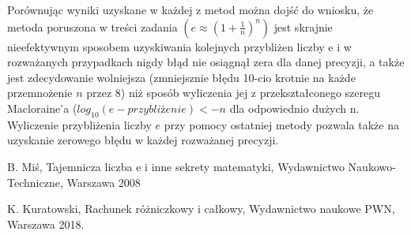 \documentclass{article}
\begin{document}
Porównując wyniki uzyskane w każdej z metod można dojść do wniosku, że metoda poruszona w treści zadania $(e\approx(1+\frac{1}{n})^{n})$ jest skrajnie nieefektywnym sposobem uzyskiwania kolejnych przybliżen liczby e i w rozważanych przypadkach nigdy błąd nie osiągnął zera dla danej precyzji, a także jest zdecydowanie wolniejsza (zmniejsznie błędu 10-cio krotnie na każde przemnożenie $n$ przez 8) niż sposób wyliczenia jej z przekształconego szeregu Macloraine'a ($log_{10}(e-przybliżenie)<-n$ dla odpowiednio dużych n. Wyliczenie przybliżenia liczby $e$ przy pomocy ostatniej metody pozwala także na uzyskanie zerowego błędu w każdej rozważanej precyzji.

\begin{thebibliography}{9}
\itemsep2pt
 B. Miś, Tajemnicza liczba e i inne sekrety matematyki,  Wydawnictwo Naukowo-Techniczne, Warszawa 2008

  K. Kuratowski, Rachunek różniczkowy i całkowy, Wydawnictwo naukowe PWN, Warszawa 2018.

\end{thebibliography}
\end{document}
